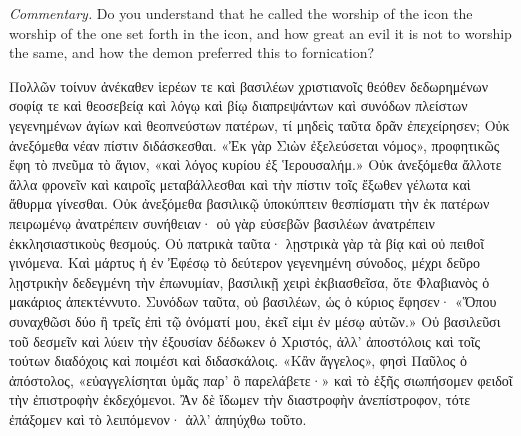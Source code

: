 \documentclass[10pt]{book}
\newcommand{\switchgreek}[1][]{\selectlanguage{polutonikogreek} \switchcolumn*[#1]}
\newcommand{\switchenglish}{\selectlanguage{english} \switchcolumn}
\begin{document}
\begin{paracol}{2}
\emph{Commentary.}
Do you understand that he called the worship of the icon the worship of
the one set forth in the icon, and how great an evil it is not to
worship the same, and how the demon preferred this to fornication?

\switchgreek

Πολλῶν τοίνυν ἀνέκαθεν ἱερέων τε καὶ βασιλέων χριστιανοῖς θεόθεν δεδωρημένων
σοφίᾳ τε καὶ θεοσεβείᾳ καὶ λόγῳ καὶ βίῳ διαπρεψάντων καὶ συνόδων πλείστων
γεγενημένων ἁγίων καὶ θεοπνεύστων πατέρων, τί μηδεὶς ταῦτα δρᾶν ἐπεχείρησεν;
Οὐκ ἀνεξόμεθα νέαν πίστιν διδάσκεσθαι. «Ἐκ γὰρ Σιὼν ἐξελεύσεται νόμος»,
προφητικῶς ἔφη τὸ πνεῦμα τὸ ἅγιον, «καὶ λόγος κυρίου ἐξ Ἱερουσαλήμ.» Οὐκ
ἀνεξόμεθα ἄλλοτε ἄλλα φρονεῖν καὶ καιροῖς μεταβάλλεσθαι καὶ τὴν πίστιν τοῖς
ἔξωθεν γέλωτα καὶ ἄθυρμα γίνεσθαι. Οὐκ ἀνεξόμεθα βασιλικῷ ὑποκύπτειν
θεσπίσματι τὴν ἐκ πατέρων πειρωμένῳ ἀνατρέπειν συνήθειαν· οὐ γὰρ εὐσεβῶν
βασιλέων ἀνατρέπειν ἐκκλησιαστικοὺς θεσμούς. Οὐ πατρικὰ ταῦτα· λῃστρικὰ γὰρ τὰ
βίᾳ καὶ οὐ πειθοῖ γινόμενα. Καὶ μάρτυς ἡ ἐν Ἐφέσῳ τὸ δεύτερον γεγενημένη
σύνοδος, μέχρι δεῦρο λῃστρικὴν δεδεγμένη τὴν ἐπωνυμίαν, βασιλικῇ χειρὶ
ἐκβιασθεῖσα, ὅτε Φλαβιανὸς ὁ μακάριος ἀπεκτέννυτο. Συνόδων ταῦτα, οὐ βασιλέων,
ὡς ὁ κύριος ἔφησεν· «Ὅπου συναχθῶσι δύο ἢ τρεῖς ἐπὶ τῷ ὀνόματί μου, ἐκεῖ εἰμι
ἐν μέσῳ αὐτῶν.» Οὐ βασιλεῦσι τοῦ δεσμεῖν καὶ λύειν τὴν ἐξουσίαν δέδωκεν ὁ
Χριστός, ἀλλ’ ἀποστόλοις καὶ τοῖς τούτων διαδόχοις καὶ ποιμέσι καὶ
διδασκάλοις. «Κἂν ἄγγελος», φησὶ Παῦλος ὁ ἀπόστολος, «εὐαγγελίσηται ὑμᾶς παρ’
ὃ παρελάβετε·» καὶ τὸ ἑξῆς σιωπήσομεν φειδοῖ τὴν ἐπιστροφὴν ἐκδεχόμενοι. Ἂν δὲ
ἴδωμεν τὴν διαστροφὴν ἀνεπίστροφον, τότε ἐπάξομεν καὶ τὸ λειπόμενον· ἀλλ’
ἀπηύχθω τοῦτο.

\switchenglish


\end{paracol}
\end{document}
